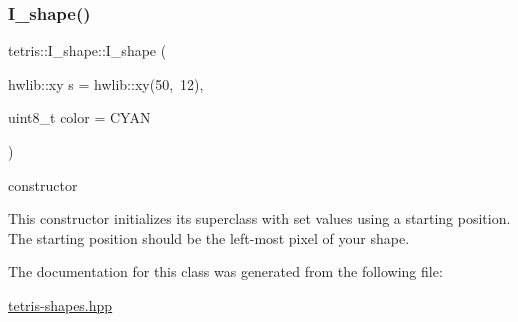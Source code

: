 \subsubsection{\texorpdfstring{I\+\_\+shape()}{I\_shape()}}
{\footnotesize\ttfamily tetris\+::\+I\+\_\+shape\+::\+I\+\_\+shape (\begin{DoxyParamCaption}\item[{hwlib\+::xy}]{s = {\ttfamily hwlib\+:\+:xy(50,~12)},  }\item[{uint8\+\_\+t}]{color = {\ttfamily CYAN} }\end{DoxyParamCaption})\hspace{0.3cm}{\ttfamily [inline]}}



constructor 

This constructor initializes its superclass with set values using a starting position. The starting position should be the left-\/most pixel of your shape. 

The documentation for this class was generated from the following file\+:\begin{DoxyCompactItemize}
\item 
\hyperlink{tetris-shapes_8hpp}{tetris-\/shapes.\+hpp}\end{DoxyCompactItemize}
